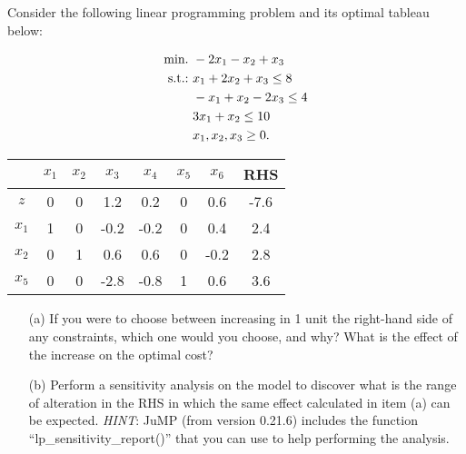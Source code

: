 Consider the following linear programming problem and its optimal tableau below:

\begin{align*}
	\mathop{\text{min.~}} & -2x_1 - x_2 + x_3 \\
	\mathop{\text{s.t.:~}}   & x_1 + 2x_2 + x_3 \le 8 \\
		  & -x_1 + x_2 - 2x_3 \le 4 \\
		  & 3x_1 + x_2 \le 10 \\
		  & x_1, x_2, x_3 \ge 0.	 
\end{align*}

\begin{center}
	\begin{tabular}{c|cccccc|c}
		        & $x_1$ & $x_2$ & $x_3$ & $x_4$ & $x_5$ & $x_6$ & RHS \\
		\hline
		    $z$ &   0   &   0   &   1.2 &   0.2 &   0   &   0.6 & -7.6 \\
		\hline
		  $x_1$ &   1   &   0   &  -0.2 &  -0.2 &   0   &   0.4 &  2.4  \\
		  $x_2$ &   0   &   1   &   0.6 &   0.6 &   0   &  -0.2 &  2.8  \\
		  $x_5$ &   0   &   0   &  -2.8 &  -0.8 &   1   &   0.6 &  3.6  \\
	\end{tabular}	
\end{center}


\begin{itemize}
	\item [(a)] If you were to choose between increasing in 1 unit the right-hand side of any constraints, which one would you choose, and why? What is the effect of the increase on the optimal cost?
	\item [(b)] Perform a sensitivity analysis on the model to discover what is the range of alteration in the RHS in which the same effect calculated in item (a) can be expected. \emph{HINT}: JuMP (from version 0.21.6) includes the function ``lp\_sensitivity\_report()'' that you can use to help performing the analysis.
\end{itemize}
